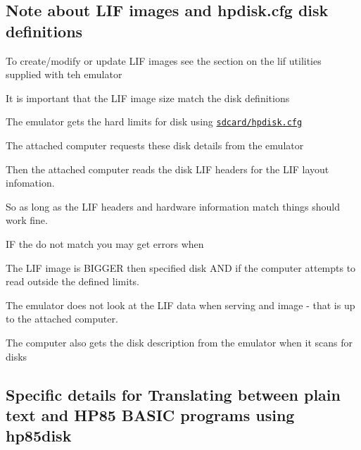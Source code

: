 \subsection*{Note about L\+IF images and hpdisk.\+cfg disk definitions}


\begin{DoxyItemize}
\item To create/modify or update L\+IF images see the section on the lif utilities supplied with teh emulator
\item It is important that the L\+IF image size match the disk definitions
\begin{DoxyItemize}
\item The emulator gets the hard limits for disk using \href{sdcard/hpdisk.cfg}{\tt sdcard/hpdisk.\+cfg}
\begin{DoxyItemize}
\item The attached computer requests these disk details from the emulator
\end{DoxyItemize}
\item Then the attached computer reads the disk L\+IF headers for the L\+IF layout infomation.
\begin{DoxyItemize}
\item So as long as the L\+IF headers and hardware information match things should work fine.
\begin{DoxyItemize}
\item IF the do not match you may get errors when
\begin{DoxyItemize}
\item The L\+IF image is B\+I\+G\+G\+ER then specified disk A\+ND if the computer attempts to read outside the defined limits.
\end{DoxyItemize}
\end{DoxyItemize}
\end{DoxyItemize}
\end{DoxyItemize}
\item The emulator does not look at the L\+IF data when serving and image -\/ that is up to the attached computer.
\begin{DoxyItemize}
\item The computer also gets the disk description from the emulator when it scans for disks
\end{DoxyItemize}
\end{DoxyItemize}





\subsection*{Specific details for Translating between plain text and H\+P85 B\+A\+S\+IC programs using hp85disk}


